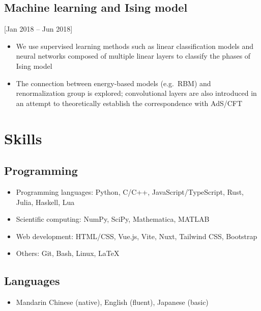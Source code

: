 \documentclass{resume-en}
\begin{document}
\subsection{Machine learning and Ising model}[\hfill Jan 2018 -- Jun 2018]

\begin{itemize}
  \item We use supervised learning methods such as linear classification models and neural networks composed of multiple linear layers to classify the phases of Ising model
  \item The connection between energy-based models (e.g.\ RBM) and renormalization group is explored; convolutional layers are also introduced in an attempt to theoretically establish the correspondence with AdS/CFT
\end{itemize}

\section{Skills}

\subsection{Programming}

\begin{itemize}
  \item Programming languages: Python, C/C++, JavaScript/TypeScript, Rust, Julia, Haskell, Lua
  \item Scientific computing: NumPy, SciPy, Mathematica, MATLAB
  \item Web development: HTML/CSS, Vue.js, Vite, Nuxt, Tailwind CSS, Bootstrap
  \item Others: Git, Bash, Linux, \LaTeX
\end{itemize}

\subsection{Languages}

\begin{itemize}
  \item Mandarin Chinese (native), English (fluent), Japanese (basic)
\end{itemize}

\lastupdated
\end{document}

